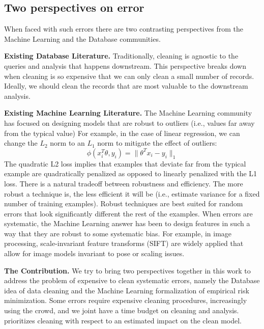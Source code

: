 \subsection{Two perspectives on error}
When faced with such errors there are two contrasting perspectives from the Machine Learning and the Database communities.

\vspace{0.5em}

\noindent\textbf{Existing Database Literature. } 
Traditionally, cleaning is agnostic to the queries and analysis that happens downstream. 
This perspective breaks down when cleaning is so expensive that we can only clean a small number of records.
Ideally, we should clean the records that are most valuable to the downstream analysis.

\vspace{0.5em}

\noindent\textbf{Existing  Machine Learning Literature. } The Machine Learning community has focused on
designing models that are robust to outliers (i.e., values far away from the typical value)
For example, in the case of linear regression, we can change the $L_2$ norm to an $L_1$ norm to mitigate the effect of outliers:
\[
\phi(x_{i}^T\theta,y_{i}) = \|\theta^Tx_{i} - y_i \|_1
\]
The quadratic L2 loss implies that examples that deviate far from the typical example are quadratically penalized as opposed to linearly penalized with the L1 loss.
There is a natural tradeoff between robustness and efficiency.
The more robust a technique is, the less efficient it will be (i.e., estimate variance for a fixed number of training examples).
Robust techniques are best suited for random errors that look significantly different the rest of the examples.
When errors are systematic, the Machine Learning answer has been to design features in such a way that they are robust to some systematic bias.
For example, in image processing, scale-invariant feature transforms (SIFT) are widely applied that allow for image models invariant to pose or scaling issues.

\vspace{0.5em}

\noindent\textbf{The \sys Contribution. } We try to bring two perspectives together in this work to address the problem of expensive to clean systematic errors, namely the Database idea of data cleaning and the Machine Learning formalization of empirical risk minimization.
Some errors require expensive cleaning procedures, increasingly using the crowd, and we joint have a time budget on cleaning and analysis.
\sys prioritizes cleaning with respect to an estimated impact on the clean model.


